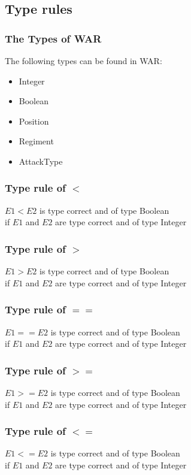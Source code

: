 \subsection{Type rules}
	\subsubsection{The Types of WAR}
		The following types can be found in WAR: \\
		\begin{itemize}
			\item Integer
			\item Boolean
			\item Position
			\item Regiment
			\item AttackType
		\end{itemize}
		
	\subsubsection*{Type rule of $<$}
		$E1 < E2$ is type correct and of type Boolean\\
		if $E1$ and $E2$ are type correct and of type Integer
	\subsubsection*{Type rule of $>$}
		$E1 > E2$ is type correct and of type Boolean\\
		if $E1$ and $E2$ are type correct and of type Integer
	\subsubsection*{Type rule of $==$}
		$E1 == E2$ is type correct and of type Boolean\\
		if $E1$ and $E2$ are type correct and of type Integer
	\subsubsection*{Type rule of $>=$}
		$E1 >= E2$ is type correct and of type Boolean\\
		if $E1$ and $E2$ are type correct and of type Integer
	\subsubsection*{Type rule of $<=$}
		$E1 <= E2$ is type correct and of type Boolean\\
		if $E1$ and $E2$ are type correct and of type Integer
